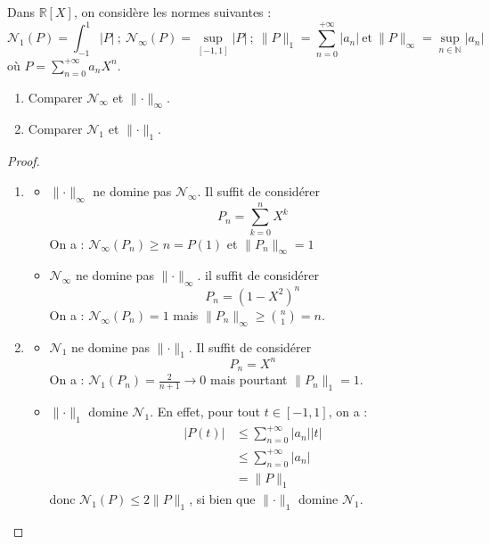 \documentclass[french,a4paper]{article}
\newcommand{\N}{\mathbb{N}}
\newcommand{\R}{\mathbb{R}}
\theoremstyle{plain}
\theoremstyle{definition}
\theoremstyle{remark}
\begin{document}
\begin{ex}{}
	Dans $\R[X]$, on considère les normes suivantes : $$\mathcal{N}_1(P)=\int_{-1}^{1}\lvert P\rvert \ ; \ \mathcal{N}_\infty(P)=\underset{[-1,1]}{\sup}\lvert P\rvert \ ; \ \lVert P\rVert_1=\sum_{n=0}^{+\infty}\lvert a_n\rvert \ \text{et}\ \lVert P\rVert_\infty=\underset{n\in\N}{\sup}\lvert a_n\rvert$$ où $P=\displaystyle\sum_{n=0}^{+\infty}a_nX^n$.
	\begin{enumerate}
		\item Comparer $\mathcal{N}_\infty$ et $\lVert\cdot\rVert_\infty$.
		\item Comparer $\mathcal{N}_1$ et $\lVert\cdot\rVert_1$.
	\end{enumerate}
\end{ex}
\begin{proof}
	\begin{enumerate}
		\item \begin{itemize}
			\item $\lVert\cdot\rVert_\infty$ ne domine pas $\mathcal{N}_\infty$. Il suffit de considérer $$P_n=\sum_{k=0}^{n}X^k$$ On a : $\mathcal{N}_\infty(P_n)\geqslant n=P(1)$ et $\lVert P_n\rVert_\infty=1$
			\item $\mathcal{N}_\infty$ ne domine pas $\lVert\cdot\rVert_\infty$. il suffit de considérer $$P_n=(1-X^2)^n$$ On a : $\mathcal{N}_\infty(P_n)=1$ mais $\lVert P_n\rVert_\infty\geqslant \binom{n}{1}=n$.
		\end{itemize}
		\item \begin{itemize}
			\item $\mathcal{N}_1$ ne domine pas $\lVert\cdot\rVert_1$. Il suffit de considérer $$P_n=X^n$$ On a : $\mathcal{N}_1(P_n)=\displaystyle\frac{2}{n+1}\to 0$ mais pourtant $\lVert P_n\rVert_1=1$.
			\item $\lVert\cdot\rVert_1$ domine $\mathcal{N}_1$. En effet, pour tout $t\in[-1,1]$, on a : \begin{align*}
				\lvert P(t)\rvert&\leqslant\sum_{n=0}^{+\infty}\lvert a_n\rvert\lvert t\rvert \\
				&\leqslant\sum_{n=0}^{+\infty}\lvert a_n\rvert\\
				&=\lVert P\rVert_1
			\end{align*} donc $\mathcal{N}_1(P)\leqslant 2\lVert P\rVert_1$, si bien que $\lVert\cdot\rVert_1$ domine $\mathcal{N}_1$.
		\end{itemize}
	\end{enumerate}
\end{proof}
\end{document}
